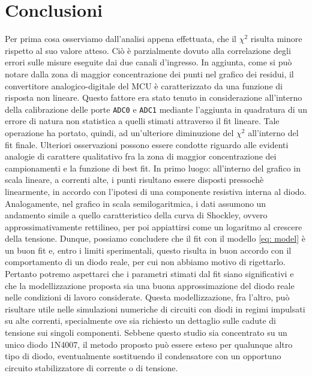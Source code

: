 \documentclass{article}[a4paper, oneside, 11pt]
\begin{document}
\section{Conclusioni}
Per prima cosa osserviamo dall'analisi appena effettuata, che il
$\chi^2$ risulta minore rispetto al suo valore atteso. Ciò \`e
parzialmente dovuto alla correlazione degli errori sulle misure eseguite
dai due canali d'ingresso. In aggiunta, come si può notare dalla
zona di maggior concentrazione dei punti nel grafico dei residui,
il convertitore analogico-digitale del MCU \`e caratterizzato da una funzione
di risposta non lineare. Questo fattore era stato tenuto in considerazione
all'interno della calibrazione delle porte \verb+ADC0+ e \verb+ADC1+ mediante
l'aggiunta in quadratura di un errore di natura non statistica a quelli stimati
attraverso il fit lineare. Tale operazione ha portato, quindi, ad
un'ulteriore diminuzione del $\chi^2$ all'interno del fit finale.
Ulteriori osservazioni possono essere condotte riguardo alle evidenti analogie
di carattere qualitativo fra la zona di maggior concentrazione dei
campionamenti e la funzione di best fit.
In primo luogo: all'interno del grafico in scala lineare, a correnti alte,
i punti risultano essere disposti pressoch\`e linearmente, in accordo con
l'ipotesi di una componente resistiva interna al diodo. Analogamente, nel
grafico in scala semilogaritmica, i dati assumono un andamento simile a quello
caratteristico della curva di Shockley, ovvero approssimativamente
rettilineo, per poi appiattirsi come un logaritmo al crescere della tensione.
Dunque, possiamo concludere che il fit con il modello \eqref{eq: model} è un
buon fit e, entro i limiti sperimentali, questo risulta in buon accordo con
il comportamento di un diodo reale, per cui non abbiamo motivo di rigettarlo.
Pertanto potremo aspettarci che i parametri stimati dal fit siano significativi 
e che la modellizzazione proposta sia una buona approssimazione del diodo reale 
nelle condizioni di lavoro considerate. Questa modellizzazione, fra l'altro, 
può risultare utile nelle simulazioni numeriche di circuiti con diodi in regimi
impulsati su alte correnti, specialmente ove sia richiesto un dettaglio
sulle cadute di tensione sui singoli componenti. 
Sebbene questo studio sia concentrato su un unico diodo 1N4007, il metodo
proposto pu\`o essere esteso per qualunque altro tipo di diodo, eventualmente
sostituendo il condensatore con un opportuno circuito stabilizzatore di
corrente o di tensione.
\end{document}
